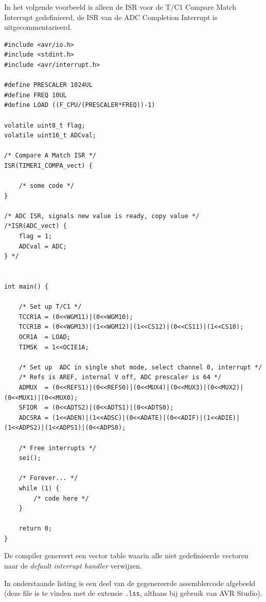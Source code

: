 \documentclass[12pt,a4paper,final,oneside,fleqn]{article}
\begin{document}
In het volgende voorbeeld is alleen de ISR voor de T/C1 Compare Match Interrupt gedefinieerd,
de ISR van de ADC Completion Interrupt is uitgecommentarieerd.

\begin{lstlisting}[style=numbers,caption=ISR vergeten]
#include <avr/io.h>
#include <stdint.h>
#include <avr/interrupt.h>

#define PRESCALER 1024UL
#define FREQ 10UL
#define LOAD ((F_CPU/(PRESCALER*FREQ))-1)

volatile uint8_t flag;
volatile uint16_t ADCval;

/* Compare A Match ISR */
ISR(TIMER1_COMPA_vect) {

	/* some code */
}

/* ADC ISR, signals new value is ready, copy value */
/*ISR(ADC_vect) {
	flag = 1;
	ADCval = ADC;
} */


int main() {

	/* Set up T/C1 */
	TCCR1A = (0<<WGM11)|(0<<WGM10);
	TCCR1B = (0<<WGM13)|(1<<WGM12)|(1<<CS12)|(0<<CS11)|(1<<CS10);
	OCR1A  = LOAD;
	TIMSK  = 1<<OCIE1A;

	/* Set up  ADC in single shot mode, select channel 0, interrupt */
	/* Refs is AREF, internal V off, ADC prescaler is 64 */
	ADMUX  = (0<<REFS1)|(0<<REFS0)|(0<<MUX4)|(0<<MUX3)|(0<<MUX2)|(0<<MUX1)|(0<<MUX0);
	SFIOR  = (0<<ADTS2)|(0<<ADTS1)|(0<<ADTS0);
	ADCSRA = (1<<ADEN)|(1<<ADSC)|(0<<ADATE)|(0<<ADIF)|(1<<ADIE)|(1<<ADPS2)|(1<<ADPS1)|(0<<ADPS0);

	/* Free interrupts */
	sei();

	/* Forever... */
	while (1) {
		/* code here */
	}

	return 0;
}
\end{lstlisting}

De compiler genereert een vector table waarin alle niet gedefinieerde vectoren
naar de \textit{default interrupt handler} verwijzen.

In onderstaande listing is een deel van de gegenereerde assemblercode afgebeeld
(deze file is te vinden met de extensie \texttt{.lss}, althans bij gebruik van
AVR Studio).
\end{document}
